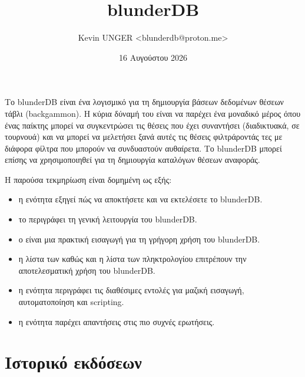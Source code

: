 \documentclass[letterpaper,10pt,greek]{sphinxmanual}
\title{blunderDB}
\date{16 Αυγούστου 2026}
\author{Kevin UNGER <blunderdb@proton.me>}
\begin{document}
\pagestyle{empty}
\sphinxmaketitle
\pagestyle{plain}
\sphinxtableofcontents
\pagestyle{normal}
\label{\detokenize{index::doc}}


\sphinxAtStartPar
Το blunderDB είναι ένα λογισμικό για τη δημιουργία βάσεων δεδομένων θέσεων τάβλι (backgammon). Η κύρια δύναμή του είναι να παρέχει ένα μοναδικό μέρος όπου ένας παίκτης μπορεί να συγκεντρώσει τις θέσεις που έχει συναντήσει (διαδικτυακά, σε τουρνουά) και να μπορεί να μελετήσει ξανά αυτές τις θέσεις φιλτράροντάς τες με διάφορα φίλτρα που μπορούν να συνδυαστούν αυθαίρετα. Το blunderDB μπορεί επίσης να χρησιμοποιηθεί για τη δημιουργία καταλόγων θέσεων αναφοράς.

\sphinxAtStartPar
Η παρούσα τεκμηρίωση είναι δομημένη ως εξής:
\begin{itemize}
\item {} 
\sphinxAtStartPar
η ενότητα  εξηγεί πώς να αποκτήσετε και να εκτελέσετε το blunderDB.

\item {} 
\sphinxAtStartPar
το  περιγράφει τη γενική λειτουργία του blunderDB.

\item {} 
\sphinxAtStartPar
ο  είναι μια πρακτική εισαγωγή για τη γρήγορη χρήση του blunderDB.

\item {} 
\sphinxAtStartPar
η λίστα των  καθώς και η λίστα των  πληκτρολογίου επιτρέπουν την αποτελεσματική χρήση του blunderDB.

\item {} 
\sphinxAtStartPar
η ενότητα  περιγράφει τις διαθέσιμες εντολές για μαζική εισαγωγή, αυτοματοποίηση και scripting.

\item {} 
\sphinxAtStartPar
η ενότητα  παρέχει απαντήσεις στις πιο συχνές ερωτήσεις.

\end{itemize}


\chapter{Ιστορικό εκδόσεων}
\label{\detokenize{index:historique-des-versions}}
\end{document}
